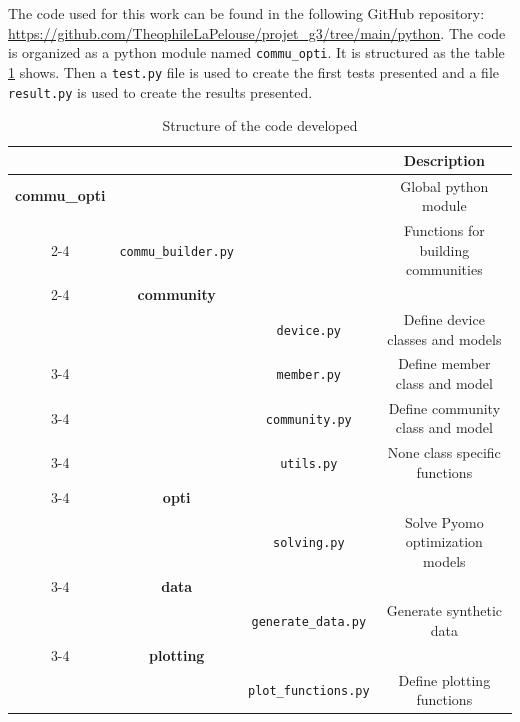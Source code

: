 The code used for this work can be found in the following GitHub repository: \url{https://github.com/TheophileLaPelouse/projet_g3/tree/main/python}. The code is organized as a python module named \texttt{commu\_opti}. It is structured as the table \ref{tab:code_structure} shows. Then a \texttt{test.py} file is used to create the first tests presented and a file \texttt{result.py} is used to create the results presented.


\begin{table}[h]
    \centering
    \begin{tabular}{|c|c|c|c|}
        \hline
        \multicolumn{3}{|c|}{} & \textbf{Description} \\
        \hline
        \textbf{commu\_opti} & & & Global python module \\
        \cline{2-4}
        & \texttt{commu\_builder.py} & & Functions for building communities \\
        \cline{2-4}
        & \textbf{community} & &  \\

        & & \texttt{device.py} & Define device classes and models \\
        \cline{3-4}
        & & \texttt{member.py} & Define member class and model \\
        \cline{3-4}
        & & \texttt{community.py} & Define community class and model \\
        \cline{3-4}
        & & \texttt{utils.py} & None class specific functions \\
        \cline{3-4}
        \cline{2-4}
        & \textbf{opti} & &  \\

        & & \texttt{solving.py} & Solve Pyomo optimization models \\
        \cline{3-4}
        \cline{2-4}
        & \textbf{data} & &  \\

        & & \texttt{generate\_data.py} & Generate synthetic data \\
        \cline{3-4}
        \cline{2-4}
        & \textbf{plotting} & &  \\

        & & \texttt{plot\_functions.py} & Define plotting functions \\
        \hline
    \end{tabular}
    \caption{Structure of the code developed}
    \label{tab:code_structure}
\end{table}

